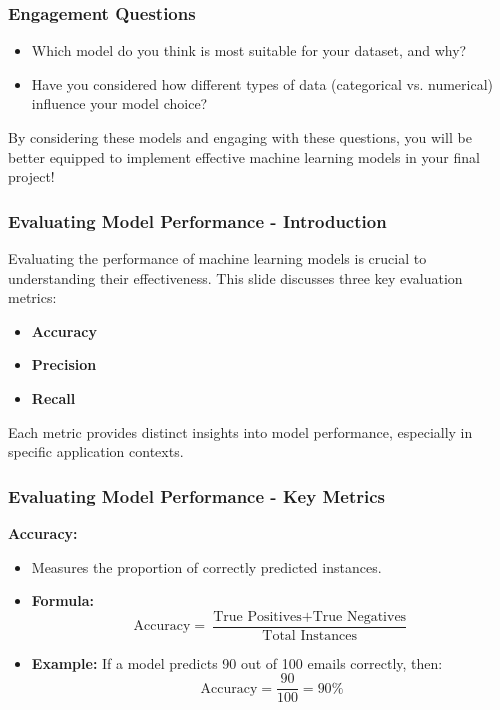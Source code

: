 \documentclass[aspectratio=169]{beamer}
\begin{document}
\begin{frame}[fragile]
    \frametitle{Engagement Questions}
    \begin{itemize}
        \item Which model do you think is most suitable for your dataset, and why?
        \item Have you considered how different types of data (categorical vs. numerical) influence your model choice?
    \end{itemize}
    By considering these models and engaging with these questions, you will be better equipped to implement effective machine learning models in your final project!
\end{frame}

\begin{frame}[fragile]
    \frametitle{Evaluating Model Performance - Introduction}
    Evaluating the performance of machine learning models is crucial to understanding their effectiveness. 
    This slide discusses three key evaluation metrics:
    \begin{itemize}
        \item \textbf{Accuracy}
        \item \textbf{Precision}
        \item \textbf{Recall}
    \end{itemize}
    Each metric provides distinct insights into model performance, especially in specific application contexts.
\end{frame}

\begin{frame}[fragile]
    \frametitle{Evaluating Model Performance - Key Metrics}
    \textbf{Accuracy:}
    \begin{itemize}
        \item Measures the proportion of correctly predicted instances.
        \item \textbf{Formula:} 
        \begin{equation}
        \text{Accuracy} = \frac{\text{True Positives} + \text{True Negatives}}{\text{Total Instances}}
        \end{equation}
        \item \textbf{Example:} If a model predicts 90 out of 100 emails correctly, then:
        \begin{equation}
        \text{Accuracy} = \frac{90}{100} = 90\%
        \end{equation}
    \end{itemize}
\end{frame}
\end{document}

